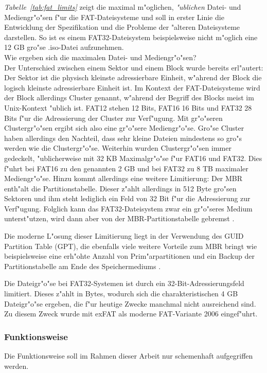 \documentclass[11pt]{article}
\newcommand*{\tab}[1]{\textit{Tabelle~\ref{#1}}}
\begin{document}
\tab{tab:fat_limits} zeigt die maximal m"oglichen, \textit{"ublichen} Datei- und Mediengr"o"sen f"ur die FAT-Dateisysteme
und soll in erster Linie die Entwicklung der Spezifikation und die Probleme der "alteren Dateisysteme darstellen.
So ist es einem FAT32-Dateisystem beispielsweise nicht m"oglich eine 12 GB gro"se .iso-Datei aufzunehmen.\\
Wie ergeben sich die maximalen Datei- und Mediengr"o"sen?\\
Der Unterschied zwischen einem Sektor und einem Block wurde bereits erl"autert: 
Der Sektor ist die physisch kleinste adressierbare Einheit, 
w"ahrend der Block die logisch kleinste adressierbare Einheit ist. Im Kontext der FAT-Dateisysteme wird
der Block allerdings Cluster genannt, w"ahrend der Begriff des Blocks meist im Unix-Kontext "ublich ist. 
FAT12 stehen 12 Bits, FAT16 16 Bits und FAT32 28 Bits f"ur die Adressierung der Cluster zur Verf"ugung.
Mit gr"o"seren Clustergr"o"sen ergibt sich also eine gr"o"sere Mediengr"o"se. 
Gro"se Cluster haben allerdings den Nachteil, dass sehr kleine Dateien mindestens so gro"s werden wie die Clustergr"o"se.
Weiterhin wurden Clustergr"o"sen immer gedeckelt, "ublicherweise mit 32 KB Maximalgr"o"se f"ur FAT16 und FAT32.
Dies f"uhrt bei FAT16 zu den genannten 2 GB und bei FAT32 zu 8 TB maximaler Mediengr"o"se.
Hinzu kommt allerdings eine weitere Limitierung: Der MBR enth"alt die Partitionstabelle. Dieser z"ahlt allerdings
in 512 Byte gro"sen Sektoren und ihm steht lediglich ein Feld von 32 Bit f"ur die Adressierung zur Verf"ugung.
Folglich kann das FAT32-Dateisystem zwar ein gr"o"seres Medium unterst"utzen, wird dann aber von der MBR-Partitionstabelle
gebremst \cite{MSLearnFS}\cite{FAT32}. 

Die moderne L"osung dieser Limitierung liegt in der Verwendung des GUID Partition Table (GPT),
die ebenfalls viele weitere Vorteile zum MBR bringt wie beispielsweise eine erh"ohte Anzahl von Prim"arpartitionen und ein Backup
der Partitionstabelle am Ende des Speichermediums \cite{gpt}.

Die Dateigr"o"se bei FAT32-Systemen ist durch ein 32-Bit-Adressierungsfeld limitiert. Dieses z"ahlt in Bytes, wodurch sich
die charakteristischen 4 GB Dateigr"o"se ergeben, die f"ur heutige Zwecke manchmal nicht ausreichend sind\cite{MSLearnFS}\cite{FAT32}.
Zu diesem Zweck wurde mit exFAT als moderne FAT-Variante 2006 eingef"uhrt.

\subsubsection{Funktionsweise}
Die Funktionsweise soll im Rahmen dieser Arbeit nur schemenhaft aufgegriffen werden.
\end{document}
